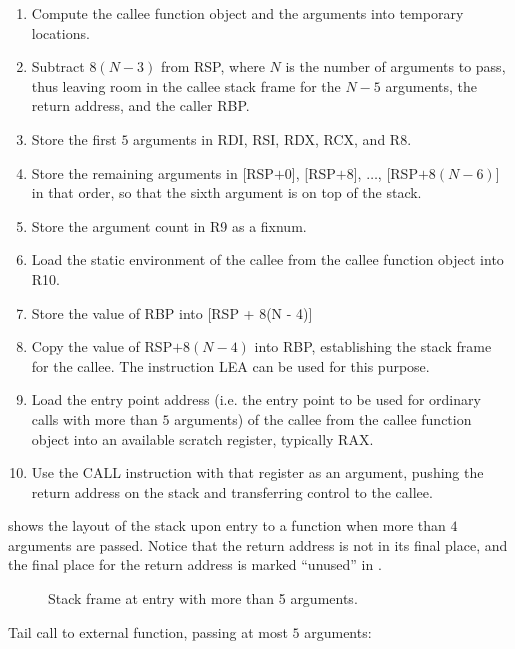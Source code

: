 \begin{enumerate}
\item Compute the callee function object and the arguments into
  temporary locations.
\item Subtract $8(N - 3)$ from RSP, where $N$ is the number of
  arguments to pass, thus leaving room in the callee stack frame for
  the $N - 5$ arguments, the return address, and the caller RBP.
\item Store the first $5$ arguments in RDI, RSI, RDX, RCX, and R8.
\item Store the remaining arguments in [RSP$ + 0$], [RSP$ + 8$],
  $\ldots$, [RSP$ + 8(N - 6)$] in that order, so that the sixth
  argument is on top of the stack.
\item Store the argument count in R9 as a fixnum.
\item Load the static environment of the callee from the callee
  function object into R10.
\item Store the value of RBP into [RSP + 8(N - 4)]
\item Copy the value of RSP$ + 8(N - 4)$ into RBP, establishing the
  stack frame for the callee.  The instruction LEA can be used for
  this purpose.
\item Load the entry point address (i.e. the entry point to be used
  for ordinary calls with more than $5$ arguments) of the callee from
  the callee function object into an available scratch register,
  typically RAX.
\item Use the CALL instruction with that register as an argument,
  pushing the return address on the stack and transferring control to
  the callee.
\end{enumerate}

 shows the layout of the stack
upon entry to a function when more than $4$ arguments are passed.
Notice that the return address is not in its final place, and the
final place for the return address is marked ``unused'' in
.

\begin{figure}
\begin{center}
\end{center}
\caption{\label{fig-x86-64-stack-frame-at-entry}
Stack frame at entry with more than 5 arguments.}
\end{figure}

Tail call to external function, passing at most $5$ arguments:

